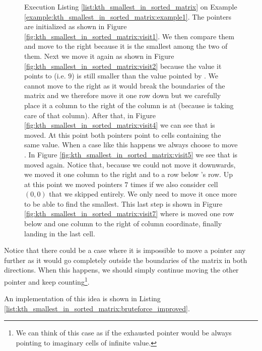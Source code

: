 \begin{figure}
     \caption[Execution Listing \ref{list:kth_smallest_in_sorted_matrix} on Example \ref{example:kth_smallest_in_sorted_matrix:example1}]{Execution Listing \ref{list:kth_smallest_in_sorted_matrix} on Example \ref{example:kth_smallest_in_sorted_matrix:example1}. The pointers are initialized as shown in Figure \ref{fig:kth_smallest_in_sorted_matrix:visit1}. We then compare them and move  to the right because it is the smallest among the two of them. Next we move it again as shown in Figure \ref{fig:kth_smallest_in_sorted_matrix:visit2} because the value it points to (i.e. $9$) is still smaller than the value pointed by . We cannot move  to the right as it would break the boundaries of the matrix and we therefore move it one row down but we carefully place it a column to the right of the column  is at (because  is taking care of that column). After that, in Figure \ref{fig:kth_smallest_in_sorted_matrix:visit4} we can see that   is moved. At this point both pointers point to cells containing the same value. When a case like this happens we always choose to move . In Figure \ref{fig:kth_smallest_in_sorted_matrix:visit5} we see that  is moved again. Notice that, because we could not move it downwards, we moved it one column to the right and to a row below 's row. Up at this point we moved pointers $7$ times if we also consider cell $(0,0)$ that we skipped entirely. We only need to move it once more to be able to find the  smallest. This last step is shown in Figure \ref{fig:kth_smallest_in_sorted_matrix:visit7} where  is moved one row below and one column to the right of  column coordinate, finally landing in the last cell.}
      \label{fig:kth_smallest_in_sorted_matrix:visitall}
\end{figure}

Notice that there could be a case where it is impossible to move a pointer any further as it would go completely outside the boundaries of the matrix in both directions. When this happens, we should simply continue moving the other pointer and keep counting\footnote{We can think of this case as if the exhausted pointer would be always pointing to imaginary cells of infinite value.}.

An implementation of this idea is shown in Listing \ref{list:kth_smallest_in_sorted_matrix:bruteforce_improved}.



